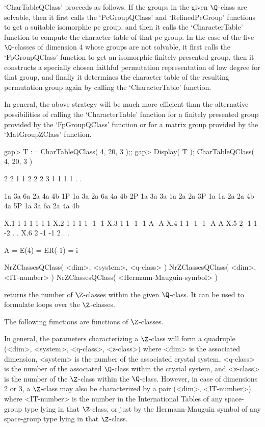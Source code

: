 `CharTableQClass' proceeds as follows.  If the groups in the given
$\Q$-class are solvable, then it first calls the `PcGroupQClass' and
`RefinedPcGroup' functions to get a suitable isomorphic pc group, and 
then it calls the `CharacterTable' function to compute the
character table of that pc group.  In the case of the five
$\Q$-classes of dimension 4 whose groups are not solvable, it first
calls the `FpGroupQClass' function to get an isomorphic finitely
presented group, then it constructs a specially chosen faithful
permutation representation of low degree for that group, and finally
it determines the character table of the resulting permutation group
again by calling the `CharacterTable' function.

In general, the above strategy will be much more efficient than the
alternative possibilities of calling the `CharacterTable' function for a
finitely presented group provided by the `FpGroupQClass' function or
for a matrix group provided by the `MatGroupZClass' function.

\beginexample
gap> T := CharTableQClass( 4, 20, 3 );;
gap> Display( T );
CharTableQClass( 4, 20, 3 )

     2  2  1  1  2  2  2
     3  1  1  1  1  .  .

       1a 3a 6a 2a 4a 4b
    1P 1a 3a 2a 6a 4a 4b
    2P 1a 3a 3a 1a 2a 2a
    3P 1a 1a 2a 2a 4b 4a
    5P 1a 3a 6a 2a 4a 4b

X.1     1  1  1  1  1  1
X.2     1  1  1  1 -1 -1
X.3     1  1 -1 -1  A -A
X.4     1  1 -1 -1 -A  A
X.5     2 -1  1 -2  .  .
X.6     2 -1 -1  2  .  .

A = E(4)
  = ER(-1) = i
\endexample


\>NrZClassesQClass( <dim>, <system>, <q-class> )
\>NrZClassesQClass( <dim>, <IT-number> )
\>NrZClassesQClass( <Hermann-Mauguin-symbol> )

returns the number of $\Z$-classes within the given $\Q$-class. It can
be used to formulate loops over the $\Z$-classes.

The following functions are functions of $\Z$-classes.

In general, the parameters characterizing a $\Z$-class will form a
quadruple (<dim>, <system>, <q-class>, <z-class>) where <dim> is the
associated dimension, <system> is the number of the associated crystal
system, <q-class> is the number of the associated $\Q$-class within
the crystal system, and <z-class> is the number of the $\Z$-class
within the $\Q$-class.  However, in case of dimensions 2 or 3, a
$\Z$-class may also be characterized by a pair (<dim>, <IT-number>)
where <IT-number> is the number in the International Tables
\cite{Hah95} of any space-group type lying in that $\Z$-class, or just
by the Hermann-Mauguin symbol of any space-group type lying in that
$\Z$-class.

